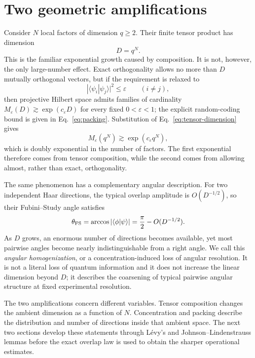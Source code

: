 \documentclass[aps,pra,reprint,superscriptaddress,nofootinbib,longbibliography]{revtex4-2}
\newcommand{\eps}{\varepsilon}
\begin{document}
\section{Two geometric amplifications}
\label{sec:two-amplifications}

Consider $N$ local factors of dimension $q\geq2$.  Their finite tensor
product has dimension
\begin{equation}
 D=q^N.
 \label{eq:tensor-dimension}
\end{equation}
This is the familiar exponential growth caused by composition.  It is not,
however, the only large-number effect.  Exact orthogonality allows no more
than $D$ mutually orthogonal vectors, but if the requirement is relaxed to
\begin{equation}
 |\langle\psi_i|\psi_j\rangle|^2\leq\eps\qquad(i\neq j),
 \label{eq:quasiorthogonality-preview}
\end{equation}
then projective Hilbert space admits families of cardinality
$M_\eps(D)\gtrsim\exp(c_\eps D)$ for every fixed $0<\eps<1$; the explicit
random-coding bound is given in Eq.~\eqref{eq:packing}.  Substitution of
Eq.~\eqref{eq:tensor-dimension} gives
\begin{equation}
 M_\eps(q^N)\gtrsim\exp(c_\eps q^N),
 \label{eq:double-explosion}
\end{equation}
which is doubly exponential in the number of factors.  The first exponential
therefore comes from tensor composition, while the second comes from allowing
almost, rather than exact, orthogonality.

The same phenomenon has a complementary angular description.  For two
independent Haar directions, the typical overlap amplitude is
$O(D^{-1/2})$, so their Fubini--Study angle satisfies
\begin{equation}
 \theta_{\rm FS}=\arccos|\langle\phi|\psi\rangle|
 =\frac{\pi}{2}-O(D^{-1/2}).
 \label{eq:angular-homogenization}
\end{equation}
As $D$ grows, an enormous number of directions becomes available, yet most
pairwise angles become nearly indistinguishable from a right angle.  We call
this \emph{angular homogenization}, or a concentration-induced loss of
angular resolution.  It is not a literal loss of quantum information and it
does not increase the linear dimension beyond $D$; it describes the
coarsening of typical pairwise angular structure at fixed experimental
resolution.

The two amplifications concern different variables.  Tensor composition
changes the ambient dimension as a function of $N$.  Concentration and
packing describe the distribution and number of directions inside that
ambient space.  The next two sections develop these statements through
L\'evy's and Johnson--Lindenstrauss lemmas before the exact overlap law is
used to obtain the sharper operational estimates.
\end{document}
